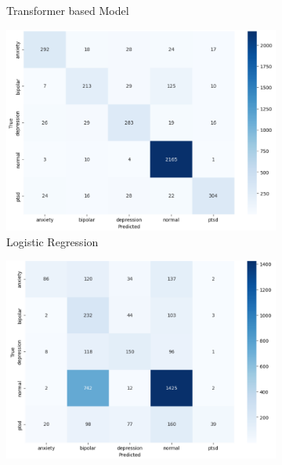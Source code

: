 \begin{figure}[H]
\begin{subfigure}[b]{0.49\textwidth}
        \caption*{Transformer based Model}
        \label{dfdl145}  %
    \end{subfigure}
    \label{fig:lstm_comparison}
    \caption*{Confusion Matrices for Models without Hyperparameter Tuning}
    \vspace{0.75cm}
    \begin{subfigure}[b]{0.49\textwidth}
        \centering
        \includegraphics[width=\textwidth]{Images/HP LR CM.png}
        \caption*{Logistic Regression}
        \label{LSTMROC2}  %
    \end{subfigure}
    \hfill
    \vspace{0.5cm}
    \begin{subfigure}[b]{0.49\textwidth}
        \centering
        \includegraphics[width=\textwidth]{Images/HP KNN CM.png}

\end{subfigure}
\end{figure}
